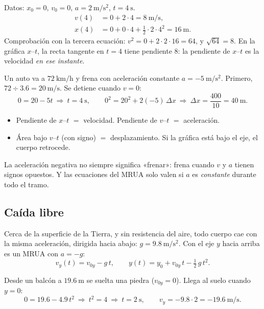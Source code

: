 \documentclass[11pt,a4paper]{article}
\begin{document}
\begin{ejemplo}
Datos: $x_0=0$, $v_0=0$, $a=\SI{2}{\meter\per\second\squared}$, $t=\SI{4}{\second}$.
\begin{align*}
v(4)&=0+2\cdot4=\SI{8}{\meter\per\second},\\
x(4)&=0+0\cdot4+\tfrac12\cdot2\cdot4^{2}=\SI{16}{\meter}.
\end{align*}
Comprobación con la tercera ecuación: $v^2=0+2\cdot2\cdot16=64$, y $\sqrt{64}=8$. En la gráfica $x$--$t$, la recta
tangente en $t=4$ tiene pendiente $8$: la pendiente de $x$--$t$ es la velocidad \emph{en ese instante}.
\end{ejemplo}
\begin{ejemplo}
Un auto va a $\SI{72}{\kilo\meter\per\hour}$ y frena con aceleración constante $a=-\SI{5}{\meter\per\second\squared}$.
Primero, $72\div3.6=\SI{20}{\meter\per\second}$. Se detiene cuando $v=0$:
\[ 0=20-5t\ \Rightarrow\ t=\SI{4}{\second},\qquad 0^2=20^2+2(-5)\,\Delta x\ \Rightarrow\ \Delta x=\frac{400}{10}=\SI{40}{\meter}. \]
\end{ejemplo}
\begin{propiedad}
\begin{itemize}
\item Pendiente de $x$--$t$ $=$ velocidad. \quad Pendiente de $v$--$t$ $=$ aceleración.
\item Área bajo $v$--$t$ (con signo) $=$ desplazamiento. Si la gráfica está bajo el eje, el cuerpo retrocede.
\end{itemize}
\end{propiedad}
\begin{ojo}
La aceleración negativa no siempre significa «frenar»: frena cuando $v$ y $a$ tienen signos opuestos.
Y las ecuaciones del MRUA solo valen si $a$ es \emph{constante} durante todo el tramo.
\end{ojo}


\subsection{Caída libre}
Cerca de la superficie de la Tierra, y sin resistencia del aire, todo cuerpo cae con la misma aceleración,
dirigida hacia abajo: $g=\SI{9.8}{\meter\per\second\squared}$. Con el eje $y$ hacia arriba es un MRUA con $a=-g$:
\[ v_y(t)=v_{0y}-g\,t,\qquad y(t)=y_0+v_{0y}\,t-\tfrac12\,g\,t^{2}. \]
\begin{ejemplo}
Desde un balcón a $\SI{19.6}{\meter}$ se suelta una piedra ($v_{0y}=0$). Llega al suelo cuando $y=0$:
\[ 0=19.6-4.9\,t^{2}\ \Rightarrow\ t^{2}=4\ \Rightarrow\ t=\SI{2}{\second},\qquad v_y=-9.8\cdot2=-\SI{19.6}{\meter\per\second}. \]
\end{ejemplo}
\end{document}
